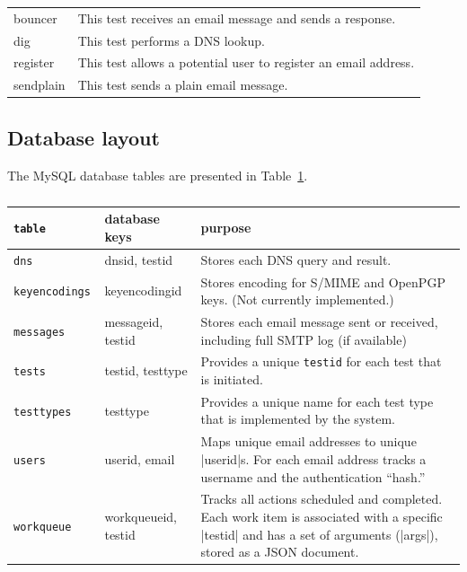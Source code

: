 \documentclass[preprint,3p]{elsarticle}
\begin{document}
\begin{center}
\begin{tabularx}{\linewidth}{lX}
bouncer &  This test receives an email message and sends a response. \\
dig     &  This test performs a DNS lookup.\\
register &  This test allows a potential user to register an email address. \\
sendplain & This test sends a plain email message.\\
\end{tabularx}
\end{center}

\subsection{Database layout}

The MySQL database tables are presented in Table~\ref{db}. 

\begin{table}
\begin{tabular}{>{\tt}llp{4in}}
\textrm{table} & database keys & purpose \\
\hline
dns & dnsid, testid & Stores each DNS query and result. \\
keyencodings & keyencodingid & Stores encoding for S/MIME and OpenPGP keys. (Not currently implemented.) \\
messages & messageid, testid & Stores each email message sent or received, including full SMTP log (if available) \\
tests & testid, testtype & Provides a unique \texttt{testid} for each test that is initiated.\\
testtypes & testtype & Provides a unique name for each test type that is implemented by the system.\\
users & userid, email & Maps unique email addresses to unique |userid|s. For each email address tracks a username and the authentication ``hash.''\\
workqueue & workqueueid, testid & Tracks all actions scheduled and completed. Each work item is associated with a specific |testid| and has a set of arguments (|args|), stored as a JSON document.\\
\end{tabular}
\caption{}\label{db}
\end{table}
\end{document}
